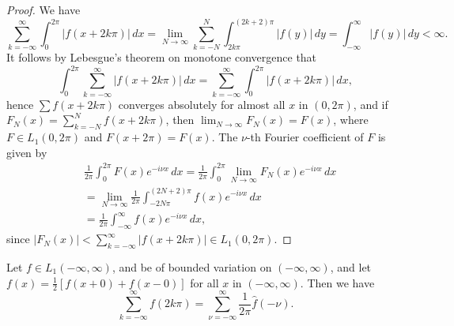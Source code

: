 \begin{proof}
We have
\begin{equation*}
\sum_{k=-\infty}^{\infty}\int_0^{2\pi}|f(x+2k\pi)|\,dx
=\lim_{N\to\infty}\sum_{k=-N}^{N}\int_{2k\pi}^{(2k+2)\pi}|f(y)|\,dy
=\int_{-\infty}^{\infty}|f(y)|\,dy<\infty.
\end{equation*}
It follows by Lebesgue's theorem on monotone convergence that
\begin{equation*}
\int_0^{2\pi}\sum_{k=-\infty}^{\infty}|f(x+2k\pi)|\,dx
=\sum_{k=-\infty}^{\infty}\int_0^{2\pi}|f(x+2k\pi)|\,dx,
\end{equation*}
hence $\sum f(x+2k\pi)$ converges absolutely for almost all $x$ in $(0,2\pi)$, and if $F_N(x)=\sum_{k=-N}^{N}f(x+2k\pi)$, then $\lim_{N\to\infty}F_N(x)=F(x)$, where $F\in L_1(0,2\pi)$ and $F(x+2\pi)=F(x)$. The $\nu$-th Fourier coefficient of $F$ is given by
\begin{align*}
&\frac{1}{2\pi}\int_0^{2\pi}F(x)e^{-i\nu x}\,dx
=\frac{1}{2\pi}\int_0^{2\pi}\lim_{N\to\infty}F_N(x)e^{-i\nu x}\,dx\\
&=\lim_{N\to\infty}\frac{1}{2\pi}\int_{-2N\pi}^{(2N+2)\pi}f(x)e^{-i\nu x}\,dx\\
&=\frac{1}{2\pi}\int_{-\infty}^{\infty}f(x)e^{-i\nu x}\,dx,
\end{align*}
since $|F_N(x)|<\sum_{k=-\infty}^{\infty}|f(x+2k\pi)|\in L_1(0,2\pi)$.
\end{proof}

\begin{theorem}\label{thm:I-6}
Let $f\in L_1(-\infty,\infty)$, and be of bounded variation on $(-\infty,\infty)$, and let $f(x)=\frac12[f(x+0)+f(x-0)]$ for all $x$ in $(-\infty,\infty)$. Then we have
\begin{equation}\label{eq:I-5.5}
\sum_{k=-\infty}^{\infty}f(2k\pi)
=\sum_{\nu=-\infty}^{\infty}\frac{1}{2\pi}\hat f(-\nu).
\end{equation}
\end{theorem}

